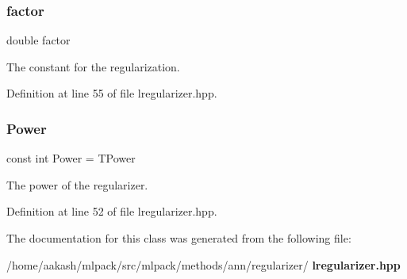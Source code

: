 \subsubsection{factor}
{\footnotesize\ttfamily double factor}



The constant for the regularization. 



Definition at line 55 of file lregularizer.\+hpp.

\mbox{\label{classmlpack_1_1ann_1_1LRegularizer_add828b673634e896b13f47cc7fb331f5}} 
\subsubsection{Power}
{\footnotesize\ttfamily const int Power = T\+Power\hspace{0.3cm}{\ttfamily [static]}}



The power of the regularizer. 



Definition at line 52 of file lregularizer.\+hpp.



The documentation for this class was generated from the following file\+:\begin{DoxyCompactItemize}
\item 
/home/aakash/mlpack/src/mlpack/methods/ann/regularizer/\textbf{ lregularizer.\+hpp}\end{DoxyCompactItemize}
